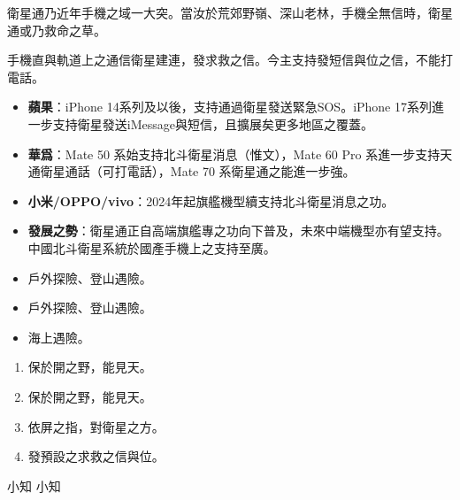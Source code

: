 


衛星通乃近年手機之域一大突。當汝於荒郊野嶺、深山老林，手機全無信時，衛星通或乃救命之草。


手機直與軌道上之通信衛星建連，發求救之信。今主支持發短信與位之信，不能打電話。


\begin{itemize}
  \item \textbf{蘋果}：iPhone 14系列及以後，支持通過衛星發送緊急SOS。iPhone 17系列進一步支持衛星發送iMessage與短信，且擴展矣更多地區之覆蓋。
  \item \textbf{華爲}：Mate 50 系始支持北斗衛星消息（惟文），Mate 60 Pro 系進一步支持天通衛星通話（可打電話），Mate 70 系衛星通之能進一步強。
  \item \textbf{小米/OPPO/vivo}：2024年起旗艦機型續支持北斗衛星消息之功。
  \item \textbf{發展之勢}：衛星通正自高端旗艦專之功向下普及，未來中端機型亦有望支持。中國北斗衛星系統於國產手機上之支持至廣。
\end{itemize}


\begin{itemize}
  \item 戶外探險、登山遇險。
  \item 戶外探險、登山遇險。
  \item 海上遇險。
\end{itemize}


\begin{enumerate}
  \item 保於開之野，能見天。
  \item 保於開之野，能見天。
  \item 依屏之指，對衛星之方。
  \item 發預設之求救之信與位。
\end{enumerate}

\begin{tcbinfo}{小知}
小知

\end{tcbinfo}

